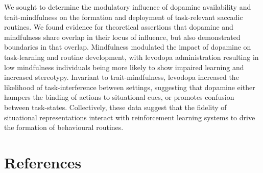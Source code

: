 \documentclass[
  man]{apa6}
\begin{document}
We sought to determine the modulatory influence of dopamine availability and trait-mindfulness on the formation and deployment of task-relevant saccadic routines. We found evidence for theoretical assertions that dopamine and mindfulness share overlap in their locus of influence, but also demonstrated boundaries in that overlap. Mindfulness modulated the impact of dopamine on task-learning and routine development, with levodopa administration resulting in low mindfulness individuals being more likely to show impaired learning and increased stereotypy. Invariant to trait-mindfulness, levodopa increased the likelihood of task-interference between settings, suggesting that dopamine either hampers the binding of actions to situational cues, or promotes confusion between task-states. Collectively, these data suggest that the fidelity of situational representations interact with reinforcement learning systems to drive the formation of behavioural routines.

\hypertarget{references}{%
\section*{References}\label{references}}
\end{document}
